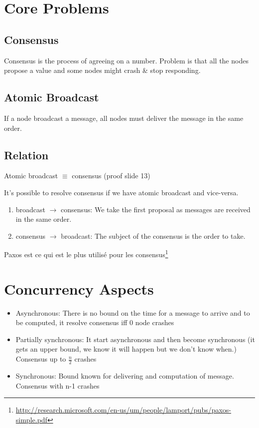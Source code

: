 \section{Core Problems}
\subsection{Consensus}
Consensus is the process of agreeing on a number.
Problem is that all the nodes propose a value and some nodes might
crash \& stop responding.

\subsection{Atomic Broadcast}
If a node broadcast a message, all nodes must deliver
the message in the same order.

\subsection{Relation}
Atomic broadcast $\equiv$ consensus (proof slide 13)

It's possible to resolve consensus if we have atomic broadcast and vice-versa.
\begin{enumerate}
    \item broadcast $\to$ consensus: We take the first proposal as
    messages are received in the same order.
    \item consensus $\to$ broadcast: The subject of the consensus is the order to take.
\end{enumerate}

Paxos est ce qui est le plus utilisé pour les consensus\footnote{\url{http://research.microsoft.com/en-us/um/people/lamport/pubs/paxos-simple.pdf}}

\section{Concurrency Aspects}

\begin{itemize}
    \item Asynchronous: There is no bound on the time for a message to
     arrive and to be computed, it resolve consensus iff 0 node crashes
    \item Partially synchronous: It start asynchronous and then become
        synchronous (it gets an upper bound, we know it will happen but we
        don't know when.)
	  Consensus up to $\frac{n}{2}$ crashes
    \item Synchronous: Bound known for delivering and computation of message. Consensus with n-1 crashes
\end{itemize}

